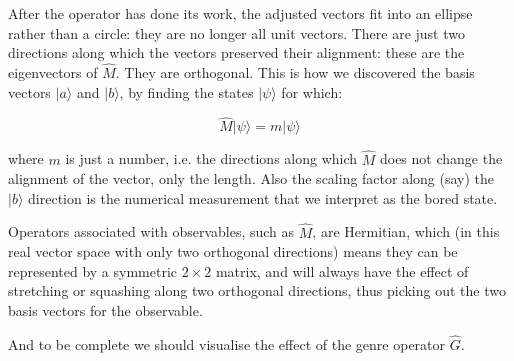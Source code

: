 After the operator has done its work, the adjusted vectors fit into an ellipse rather than a circle: they are no longer all unit vectors. There are just two directions along which the vectors preserved their alignment: these are the eigenvectors of $\hat{M}$. They are orthogonal. This is how we discovered the basis vectors $|a\rangle$ and $|b\rangle$, by finding the states $|\psi\rangle$ for which:

$$
\hat{M}|\psi\rangle = m|\psi\rangle
$$

where $m$ is just a number, i.e. the directions along which $\hat{M}$ does not change the alignment of the vector, only the length. Also the scaling factor along (say) the $|b\rangle$ direction is the numerical measurement that we interpret as the bored state.

Operators associated with observables, such as $\hat{M}$, are Hermitian, which (in this real vector space with only two orthogonal directions) means they can be represented by a symmetric $2 \times 2$ matrix, and will always have the effect of stretching or squashing along two orthogonal directions, thus picking out the two basis vectors for the observable.

And to be complete we should visualise the effect of the genre operator $\hat{G}$.

